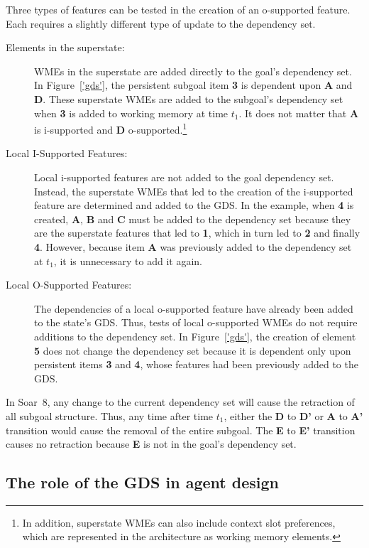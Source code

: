 Three types of features can be tested in the creation of an
o-supported feature.  Each requires a slightly different type of
update to the dependency set.
\begin{description}
\item [Elements in the superstate:] WMEs in the superstate are added
directly to the goal's dependency set.  In Figure~\ref{'gds'}, the
persistent subgoal item {\bf 3} is dependent upon {\bf A} and {\bf
D}. These superstate WMEs are added to the subgoal's dependency set when
{\bf 3} is added to working memory at time $t_1$.  It does not matter
that {\bf A} is i-supported and {\bf D} o-supported.\footnote{In addition,
superstate WMEs can also include context slot preferences, which 
are represented in the architecture as working memory elements.}
\item [Local I-Supported Features:] Local i-supported features are not
added to the goal dependency set.  Instead, the superstate WMEs that
led to the creation of the i-supported feature are determined and
added to the GDS.  In the example, when {\bf 4} is created, {\bf A},
{\bf B} and {\bf C} must be added to the dependency set because they
are the superstate features that led to {\bf 1}, which in turn led to
{\bf 2} and finally {\bf 4}.  However, because item {\bf A} was
previously added to the dependency set at $t_1$, it is unnecessary to
add it again.
\item [Local O-Supported Features:] The dependencies of a local
o-supported feature have already been added to the state's GDS.  Thus,
tests of local o-supported WMEs do not require additions to the
dependency set.  In Figure~\ref{'gds'}, the creation of element {\bf
5} does not change the dependency set because it is dependent only
upon persistent items {\bf 3} and {\bf 4}, whose features had been
previously added to the GDS.
\end{description}

In Soar~8, any change to the current dependency set will cause
the retraction of all subgoal structure.  Thus, any time after time
$t_1$, either the {\bf D} to {\bf D'} or {\bf A} to {\bf A'}
transition would cause the removal of the entire subgoal. The {\bf E}
to {\bf E'} transition causes no retraction because {\bf E} is not in
the goal's dependency set.

\subsection*{The role of the GDS in agent design}

